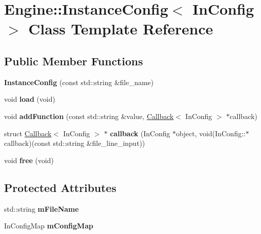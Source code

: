 \hypertarget{classEngine_1_1InstanceConfig}{}\section{Engine\+:\+:Instance\+Config$<$ In\+Config $>$ Class Template Reference}
\label{classEngine_1_1InstanceConfig}
\subsection*{Public Member Functions}
\begin{DoxyCompactItemize}
\item 
\hypertarget{classEngine_1_1InstanceConfig_a2adcdc7358ffd19d08fe804d0f61a3b6}{}{\bfseries Instance\+Config} (const std\+::string \&file\+\_\+name)\label{classEngine_1_1InstanceConfig_a2adcdc7358ffd19d08fe804d0f61a3b6}

\item 
\hypertarget{classEngine_1_1InstanceConfig_a3a93c829611478c03b8e97a1cf173e13}{}void {\bfseries load} (void)\label{classEngine_1_1InstanceConfig_a3a93c829611478c03b8e97a1cf173e13}

\item 
\hypertarget{classEngine_1_1InstanceConfig_ad5de551d2a4f49abce419a5d6cb01129}{}void {\bfseries add\+Function} (const std\+::string \&value, \hyperlink{structEngine_1_1Callback}{Callback}$<$ In\+Config $>$ $\ast$callback)\label{classEngine_1_1InstanceConfig_ad5de551d2a4f49abce419a5d6cb01129}

\item 
\hypertarget{classEngine_1_1InstanceConfig_a4fee466021ff7a615d3863e2c6df97d3}{}struct \hyperlink{structEngine_1_1Callback}{Callback}$<$ In\+Config $>$ $\ast$ {\bfseries callback} (In\+Config $\ast$object, void(In\+Config\+::$\ast$callback)(const std\+::string \&file\+\_\+line\+\_\+input))\label{classEngine_1_1InstanceConfig_a4fee466021ff7a615d3863e2c6df97d3}

\item 
\hypertarget{classEngine_1_1InstanceConfig_a71c7847307e003c480597abf1780a39b}{}void {\bfseries free} (void)\label{classEngine_1_1InstanceConfig_a71c7847307e003c480597abf1780a39b}

\end{DoxyCompactItemize}
\subsection*{Protected Attributes}
\begin{DoxyCompactItemize}
\item 
\hypertarget{classEngine_1_1InstanceConfig_a9c7136fc6b9f955295137eb1fcaaaf27}{}std\+::string {\bfseries m\+File\+Name}\label{classEngine_1_1InstanceConfig_a9c7136fc6b9f955295137eb1fcaaaf27}

\item 
\hypertarget{classEngine_1_1InstanceConfig_af82c9ec4b58e0edbef1ecba1f7eb9e14}{}In\+Config\+Map {\bfseries m\+Config\+Map}\label{classEngine_1_1InstanceConfig_af82c9ec4b58e0edbef1ecba1f7eb9e14}

\end{DoxyCompactItemize}
